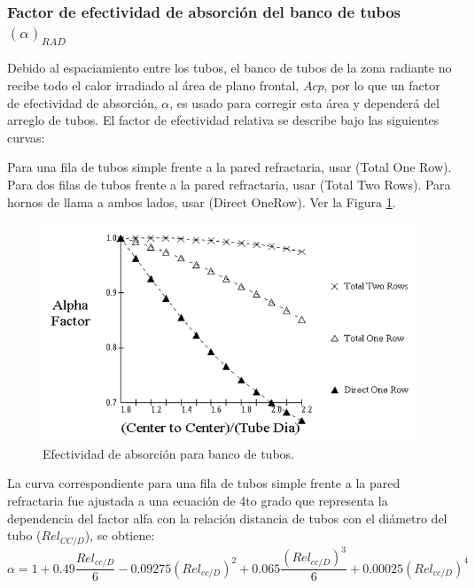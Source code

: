 \subsubsection{Factor de efectividad de absorción del banco de tubos $(\alpha)_{RAD}$}
\par Debido al espaciamiento entre los tubos, el banco de tubos de la zona radiante no recibe todo el calor irradiado al área de plano frontal, $Acp$, por lo que un factor de efectividad de absorción, $\alpha$, es usado para corregir esta área y dependerá del arreglo de tubos. El factor de efectividad relativa se describe bajo las siguientes curvas:
\par Para una fila de tubos simple frente a la pared refractaria, usar (Total One Row). Para dos filas de tubos frente a la pared refractaria, usar (Total Two Rows). Para hornos de llama a ambos lados, usar (Direct OneRow). Ver la Figura \ref{fig:alpha}.
\begin{figure}[H]
\begin{center}
\includegraphics[scale=0.45]{images/alpha}
\caption[Efectividad de absorción para banco de tubos]{Efectividad de absorción para banco de tubos.} 
\label{fig:alpha}
\end{center}
\end{figure}
\par La curva correspondiente para una fila de tubos simple frente a la pared refractaria fue ajustada a una ecuación de 4to grado que representa la dependencia del factor alfa con la relación distancia de tubos con el diámetro del tubo ($Rel_{CC/D}$), se obtiene:
\begin{equation}
    \alpha = 1 + 0.49\frac{Rel_{cc/D}}{6} -0.09275(Rel_{cc/D})^2 +
     0.065\frac{(Rel_{cc/D})^3}{6} + 0.00025(Rel_{cc/D})^4
\end{equation}

